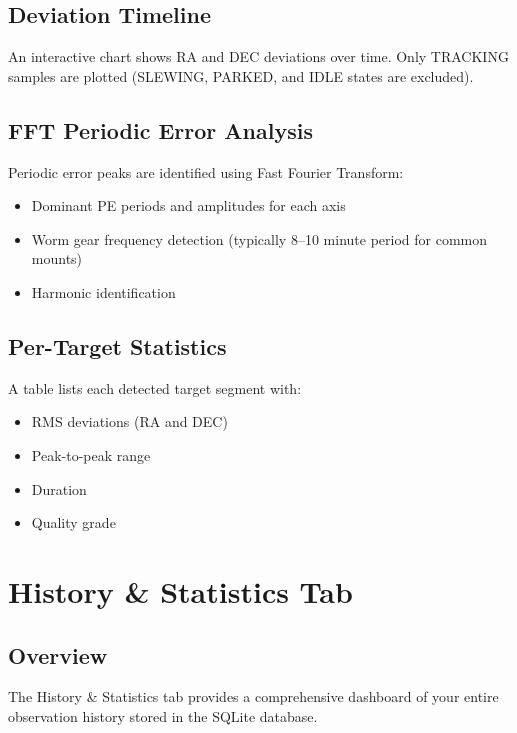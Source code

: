 \documentclass[11pt,a4paper]{article}
\begin{document}
\subsection{Deviation Timeline}

An interactive chart shows RA and DEC deviations over time. Only TRACKING samples are plotted (SLEWING, PARKED, and IDLE states are excluded).

\subsection{FFT Periodic Error Analysis}

Periodic error peaks are identified using Fast Fourier Transform:
\begin{itemize}
    \item Dominant PE periods and amplitudes for each axis
    \item Worm gear frequency detection (typically 8--10 minute period for common mounts)
    \item Harmonic identification
\end{itemize}

\subsection{Per-Target Statistics}

A table lists each detected target segment with:
\begin{itemize}
    \item RMS deviations (RA and DEC)
    \item Peak-to-peak range
    \item Duration
    \item Quality grade
\end{itemize}


\section{History \& Statistics Tab}
\label{sec:history}

\subsection{Overview}

The History \& Statistics tab provides a comprehensive dashboard of your entire observation history stored in the SQLite database.
\end{document}
